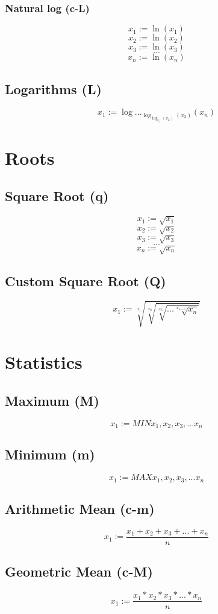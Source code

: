 \documentclass[12pt]{article}
\begin{document}
\subsubsection*{Natural log (c-L)}
\label{sec:org36134e6}
$$
x_1 := \ln(x_1)
$$
$$
x_2 := \ln(x_2)
$$
$$
x_3 := \ln(x_3)
$$
$$
...
$$
$$
x_n := \ln(x_n)
$$
\subsection*{Logarithms (L)}
\label{sec:orgb853b2d}
$$
x_1 := \log..._{\log_{\log_{x_1}(x_2)}(x_3)}(x_n)
$$
\section*{Roots}
\label{sec:org2b5f158}
\subsection*{Square Root (q)}
\label{sec:orgd1e5c3f}
$$
x_1 := \sqrt{x_1}
$$
$$
x_2 := \sqrt{x_2}
$$
$$
x_3 := \sqrt{x_3}
$$
$$
...
$$
$$
x_n := \sqrt{x_n}
$$
\subsection*{Custom Square Root (Q)}
\label{sec:org431825b}
$$
x_1 := \sqrt[x_1]{\sqrt[x_2]{\sqrt[x_3]{...\sqrt[x_{n-1}]{x_n}}}}
$$
\section*{Statistics}
\label{sec:org15e727d}
\subsection*{Maximum (M)}
\label{sec:org5076f06}
$$
x_1 := MIN {x_1, x_2, x_3, ... x_n}
$$
\subsection*{Minimum (m)}
\label{sec:org71ff885}
$$
x_1 := MAX {x_1, x_2, x_3, ... x_n}
$$
\subsection*{Arithmetic Mean (c-m)}
\label{sec:org88a92ab}
$$
x_1 := \frac{x_1 + x_2 + x_3 + ... + x_n}{n}
$$
\subsection*{Geometric Mean (c-M)}
\label{sec:org6dc6841}
$$
x_1 := \frac{x_1 * x_2 * x_3 * ... * x_n}{n}
$$
\end{document}

